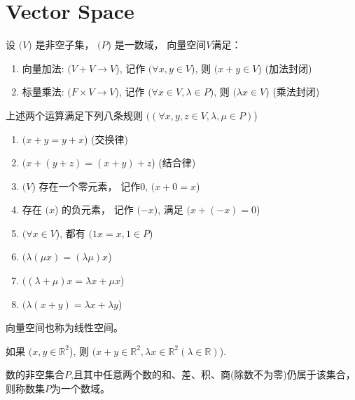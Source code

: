 \section{Vector Space}

\begin{definition}[向量空间$V$]
    设 $( V $) 是非空子集， $( P $) 是一数域， 向量空间$V$满足：

    \begin{enumerate}
        \item 向量加法: $( V+V \rightarrow V $), 记作 $( \forall x, y \in V $), 则 $( x+y \in V $) (加法封闭)
        \item 标量乘法: $( F \times V \rightarrow V $), 记作 $( \forall x \in V, \lambda \in P $), 则 $( \lambda x \in V $) (乘法封闭)
    \end{enumerate}


\end{definition}

\begin{theorem}
    上述两个运算满足下列八条规则 $( (\forall x, y, z \in V, \lambda, \mu \in P) $) 
\begin{enumerate}
    \item $( x+y=y+x $) (交换律) 
    \item $( x+(y+z)=(x+y)+z $) (结合律)
    \item $( V $) 存在一个零元素， 记作$0$, $( x+0=x $)
    \item 存在 $( x $) 的负元素， 记作 $( -x $), 满足 $( x+(-x)=0 $)
    \item $( \forall x \in V $), 都有 $( 1 x=x, 1 \in P $)
    \item $( \lambda(\mu x)=(\lambda \mu) x $)
    \item $( (\lambda+\mu) x=\lambda x+\mu x $)
    \item $(  \lambda(x+y)=\lambda x+\lambda y $)
\end{enumerate}
\end{theorem}

\begin{corollary}
    向量空间也称为线性空间。
\end{corollary}

\begin{corollary}
    如果 $( x, y \in \mathbb{R}^{2} $), 则 $( x+y \in \mathbb{R}^{2}, \lambda x \in \mathbb{R}^{2}(\lambda \in \mathbb{R}) $).
\end{corollary}

\begin{definition}[数域]
    数的非空集合$P$,且其中任意两个数的和、差、积、商(除数不为零)仍属于该集合， 则称数集$P$为一个数域。 
\end{definition}

